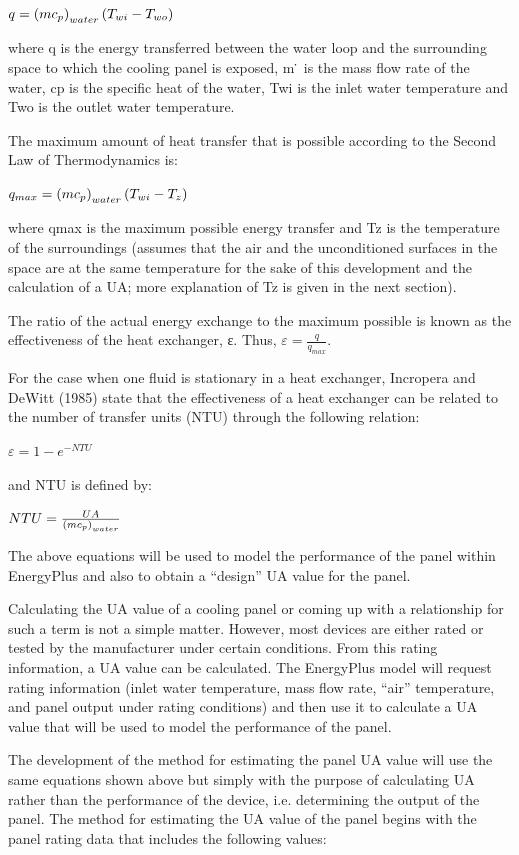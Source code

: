 $q = \PB{m c_p}_{water} \PB{T_{wi}-T_{wo}}$  %

where q is the energy transferred between the water loop and the surrounding space to which the cooling panel is exposed, m ̇ is the mass flow rate of the water, cp is the specific heat of the water, Twi is the inlet water temperature and Two is the outlet water temperature.

The maximum amount of heat transfer that is possible according to the Second Law of Thermodynamics is:

$q_{max} = \PB{m c_p}_{water} \PB{T_{wi} - T_z}$

where qmax is the maximum possible energy transfer and Tz is the temperature of the surroundings (assumes that the air and the unconditioned surfaces in the space are at the same temperature for the sake of this development and the calculation of a UA; more explanation of Tz is given in the next section).

The ratio of the actual energy exchange to the maximum possible is known as the effectiveness of the heat exchanger, ε.  Thus, $ε = \frac{q}{q_{max}}$.

For the case when one fluid is stationary in a heat exchanger, Incropera and DeWitt (1985) state that the effectiveness of a heat exchanger can be related to the number of transfer units (NTU) through the following relation:

$ε = 1 - e^{-NTU}$

and NTU is defined by:

$NTU = \frac{UA}{ \PB{m c_p}_{water} }$

The above equations will be used to model the performance of the panel within EnergyPlus and also to obtain a “design” UA value for the panel.

Calculating the UA value of a cooling panel or coming up with a relationship for such a term is not a simple matter.  However, most devices are either rated or tested by the manufacturer under certain conditions.  From this rating information, a UA value can be calculated.  The EnergyPlus model will request rating information (inlet water temperature, mass flow rate, “air” temperature, and panel output under rating conditions) and then use it to calculate a UA value that will be used to model the performance of the panel.

The development of the method for estimating the panel UA value will use the same equations shown above but simply with the purpose of calculating UA rather than the performance of the device, i.e. determining the output of the panel.  The method for estimating the UA value of the panel begins with the panel rating data that includes the following values:

